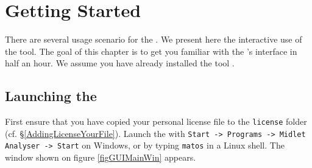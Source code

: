  \chapter{Getting Started}

 There are several usage scenario for the \ma. We present here the interactive
 use of the tool. The goal of this chapter is to get you familiar with the \ma's
 interface in half an hour. We assume you have already installed the tool .

 \section{Launching the \ma}
 First ensure that you have copied your personal license file to the
 \texttt{license} folder (cf. \S \ref{AddingLicenseYourFile}). Launch the
 \ma with \texttt{Start -> Programs -> Midlet Analyser -> Start}
 on Windows, or by typing \texttt{matos} in a Linux shell. The
 window shown on figure \ref{figGUIMainWin} appears. 
 

